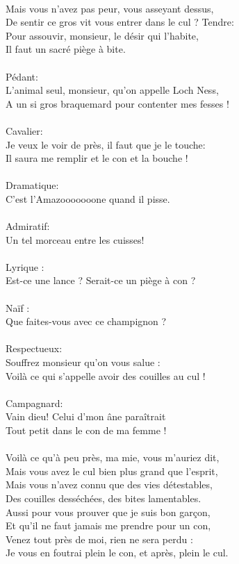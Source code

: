 \\Mais vous n'avez pas peur, vous asseyant dessus,
\\De sentir ce gros vit vous entrer dans le cul ?
\breakpage
Tendre:
\\Pour assouvir, monsieur, le désir qui l'habite,
\\Il faut un sacré piège à bite.
\\\\Pédant:
\\L'animal seul, monsieur, qu'on appelle Loch Ness,
\\A un si gros braquemard pour contenter mes fesses !
\\\\Cavalier:
\\Je veux le voir de près, il faut que je le touche:
\\Il saura me remplir et le con et la bouche !
\\\\Dramatique: 
\\C'est l'Amazooooooone quand il pisse.
\\\\Admiratif: 
\\Un tel morceau entre les cuisses!
\\\\Lyrique : 
\\Est-ce une lance ? Serait-ce un piège à con ?
\\\\Naïf : 
\\Que faites-vous avec ce champignon ?
\\\\Respectueux:
\\Souffrez monsieur qu'on vous salue :
\\Voilà ce qui s'appelle avoir des couilles au cul !
\\\\Campagnard:
\\Vain dieu! Celui d'mon âne paraîtrait
\\Tout petit dans le con de ma femme !
\\\\Voilà ce qu'à peu près, ma mie, vous m'auriez dit, 
\\Mais vous avez le cul bien plus grand que l'esprit, 
\\Mais vous n'avez connu que des vies détestables, 
\\Des couilles desséchées, des bites lamentables. 
\\Aussi pour vous prouver que je suis bon garçon, 
\\Et qu'il ne faut jamais me prendre pour un con, 
\\Venez tout près de moi, rien ne sera perdu : 
\\Je vous en foutrai plein le con, et après, plein le cul.

\breakpage